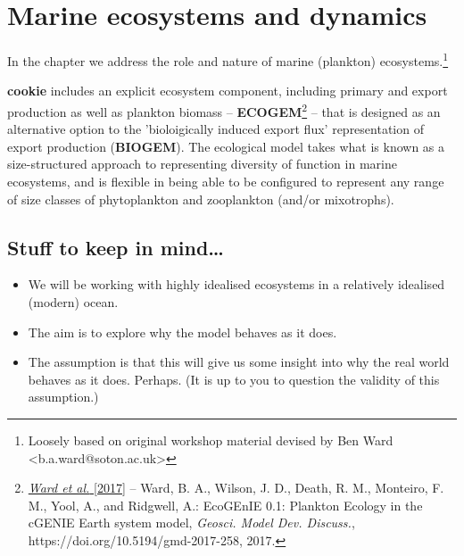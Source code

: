 
\cleardoublepage


\chapter{Marine ecosystems and dynamics}\label{ch:marine-ecosystems}

\hfill \break

\noindent In the chapter we address the role and nature of marine (plankton) ecosystems.\footnote{Loosely based on original workshop material devised by Ben Ward <b.a.ward@soton.ac.uk>}

\vspace{1mm}
\noindent \textbf{cookie} includes an explicit ecosystem component, including primary and export production as well as plankton biomass -- \textbf{ECOGEM}\footnote{\href{https://doi.org/10.5194/gmd-2017-258}{\textit{Ward et al.} [2017]} -- Ward, B. A., Wilson, J. D., Death, R. M., Monteiro, F. M., Yool, A., and Ridgwell, A.: EcoGEnIE 0.1: Plankton Ecology in the cGENIE Earth system model, \textit{Geosci. Model Dev. Discuss.}, https://doi.org/10.5194/gmd-2017-258, 2017.} -- that is designed as an alternative option to the 'bioloigically induced export flux' representation of export production (\textbf{BIOGEM}). The ecological model takes what is known as a size-structured approach to representing diversity of function in marine ecosystems, and is flexible in being able to be configured to represent any range of size classes of phytoplankton and zooplankton (and/or mixotrophs).

\section*{Stuff to keep in mind\dots}
\begin{itemize}
\item We will be working with highly idealised ecosystems in a relatively idealised (modern) ocean.
\item The aim is to explore why the model behaves as it does.
\item The assumption is that this will give us some insight into why the real world behaves as it does. Perhaps. (It is up to you to question the validity of this assumption.)
\end{itemize}


